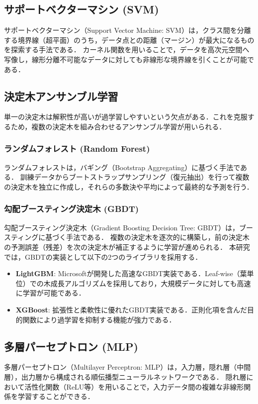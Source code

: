 \documentclass[uplatex, dvipdfmx, 11pt, a4paper, report]{jsbook}
\begin{document}
\subsection{サポートベクターマシン (SVM)}
サポートベクターマシン（Support Vector Machine: SVM）は，クラス間を分離する境界線（超平面）のうち，データ点との距離（マージン）が最大になるものを探索する手法である．
カーネル関数を用いることで，データを高次元空間へ写像し，線形分離不可能なデータに対しても非線形な境界線を引くことが可能である．

\subsection{決定木アンサンブル学習}
単一の決定木は解釈性が高いが過学習しやすいという欠点がある．これを克服するため，複数の決定木を組み合わせるアンサンブル学習が用いられる．

\subsubsection*{ランダムフォレスト (Random Forest)}
ランダムフォレストは，バギング（Bootstrap Aggregating）に基づく手法である．
訓練データからブートストラップサンプリング（復元抽出）を行って複数の決定木を独立に作成し，それらの多数決や平均によって最終的な予測を行う．

\subsubsection*{勾配ブースティング決定木 (GBDT)}
勾配ブースティング決定木（Gradient Boosting Decision Tree: GBDT）は，ブースティングに基づく手法である．
複数の決定木を逐次的に構築し，前の決定木の予測誤差（残差）を次の決定木が補正するように学習が進められる．
本研究では，GBDTの実装として以下の2つのライブラリを採用する．
\begin{itemize}
    \item \textbf{LightGBM}\cite{lightgbm}: Microsoftが開発した高速なGBDT実装である．Leaf-wise（葉単位）での木成長アルゴリズムを採用しており，大規模データに対しても高速に学習が可能である．
    \item \textbf{XGBoost}\cite{xgboost}: 拡張性と柔軟性に優れたGBDT実装である．正則化項を含んだ目的関数により過学習を抑制する機能が強力である．
\end{itemize}

\subsection{多層パーセプトロン (MLP)}
多層パーセプトロン（Multilayer Perceptron: MLP）は，入力層，隠れ層（中間層），出力層から構成される順伝播型ニューラルネットワークである．
隠れ層において活性化関数（ReLU等）を用いることで，入力データ間の複雑な非線形関係を学習することができる．
\end{document}

